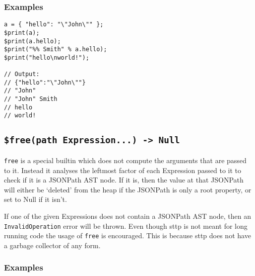 \subsubsection{Examples}

\begin{verbatim}
a = { "hello": "\"John\"" };
$print(a);
$print(a.hello);
$print("%% Smith" % a.hello);
$print("hello\nworld!");

// Output:
// {"hello":"\"John\""}
// "John"
// "John" Smith
// hello
// world!
\end{verbatim}

\cprotect\subsection{\verb|$free(path Expression...) -> Null|}

\verb|free| is a special builtin which does not compute the arguments that are passed to it. Instead it analyses the leftmost factor of each Expression passed to it to check if it is a JSONPath AST node. If it is, then the value at that JSONPath will either be `deleted' from the heap if the JSONPath is only a root property, or set to Null if it isn't.

If one of the given Expressions does not contain a JSONPath AST node, then an \verb|InvalidOperation| error will be thrown. Even though sttp is not meant for long running code the usage of \verb|free| is encouraged. This is because sttp does not have a garbage collector of any form.

\subsubsection{Examples}

